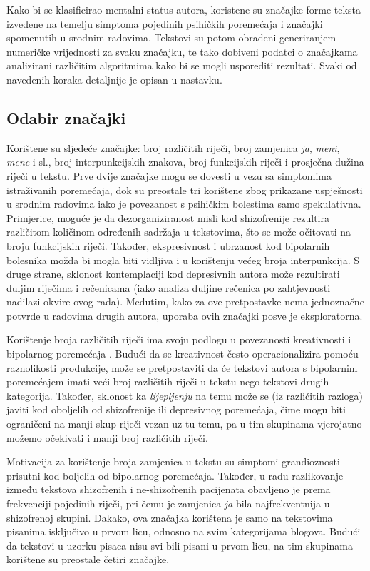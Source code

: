 \documentclass[10pt, a4paper]{article}
\begin{document}
Kako bi se klasificirao mentalni status autora, koristene su značajke forme teksta izvedene na temelju simptoma pojedinih psihičkih poremećaja i značajki spomenutih u srodnim radovima. Tekstovi su potom obrađeni generiranjem numeričke vrijednosti za svaku značajku, te tako dobiveni podatci o značajkama analizirani različitim algoritmima kako bi se mogli usporediti rezultati. Svaki od navedenih koraka detaljnije je opisan u nastavku.

\subsection{Odabir značajki}

Korištene su sljedeće značajke: broj različitih riječi, broj zamjenica \emph{ja}, \emph{meni}, \emph{mene} i sl., broj interpunkcijskih znakova, broj funkcijskih riječi i prosječna dužina riječi u tekstu. Prve dvije značajke mogu se dovesti u vezu sa simptomima istraživanih poremećaja, dok su preostale tri korištene zbog prikazane uspješnosti u srodnim radovima \citep{kristo} iako je povezanost s psihičkim bolestima samo spekulativna. Primjerice, moguće je da dezorganiziranost misli kod shizofrenije rezultira različitom količinom određenih sadržaja u tekstovima, što se može očitovati na broju funkcijskih riječi. Također, ekspresivnost i ubrzanost kod bipolarnih bolesnika možda bi mogla biti vidljiva i u korištenju većeg broja interpunkcija. S druge strane, sklonost kontemplaciji kod depresivnih autora može rezultirati duljim riječima i rečenicama (iako analiza duljine rečenica po zahtjevnosti nadilazi okvire ovog rada). Međutim, kako za ove pretpostavke nema jednoznačne potvrde u radovima drugih autora, uporaba ovih značajki posve je eksploratorna.

Korištenje broja različitih riječi ima svoju podlogu u povezanosti kreativnosti i bipolarnog poremećaja \citep{crea}. Budući da se kreativnost često operacionalizira pomoću raznolikosti produkcije, može se pretpostaviti da će tekstovi autora s bipolarnim poremećajem imati veći broj različitih riječi u tekstu nego tekstovi drugih kategorija. Također, sklonost ka \emph{lijepljenju} na temu može se (iz različitih razloga) javiti kod oboljelih od shizofrenije ili depresivnog poremećaja, čime mogu biti ograničeni na manji skup riječi vezan uz tu temu, pa u tim skupinama vjerojatno možemo očekivati i manji broj različitih riječi.

Motivacija za korištenje broja zamjenica u tekstu su simptomi grandioznosti prisutni kod boljelih od bipolarnog poremećaja. Također, u radu \citep{strous-2009} razlikovanje između tekstova shizofrenih i ne-shizofrenih pacijenata obavljeno je prema frekvenciji pojedinih riječi, pri čemu je zamjenica \emph{ja} bila najfrekventnija u shizofrenoj skupini. Dakako, ova značajka korištena je samo na tekstovima pisanima isključivo u prvom licu, odnosno na svim kategorijama blogova. Budući da tekstovi u uzorku pisaca nisu svi bili pisani u prvom licu, na tim skupinama korištene su preostale četiri značajke.
\end{document}
